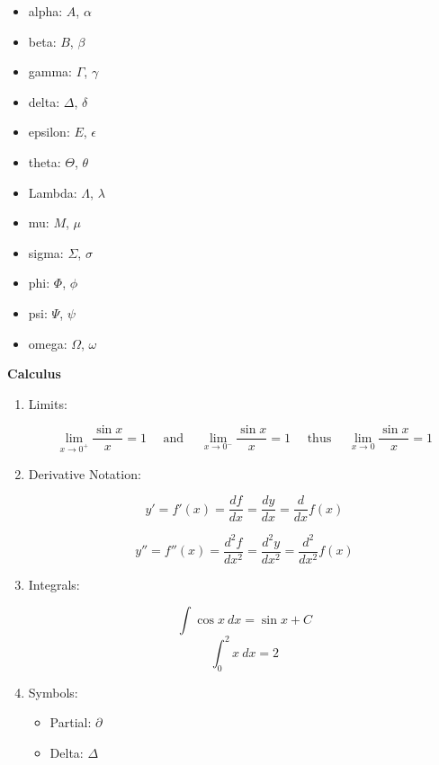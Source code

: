 \documentclass[11pt]{article}
\newcommand{\ra}{\rightarrow}
\begin{document}
\begin{multicols}{2}
\begin{itemize}
\item alpha: $A$, $\alpha$

\item beta: $B$, $\beta$

\item gamma: $\Gamma$, $\gamma$

\item delta: $\Delta$, $\delta$

\item epsilon: $E$, $\epsilon$

\item theta: $\Theta$, $\theta$
\end{itemize}

\begin{itemize}
\item Lambda: $\Lambda$, $\lambda$

\item mu: $M$, $\mu$

\item sigma: $\Sigma$, $\sigma$

\item phi: $\Phi$, $\phi$

\item psi: $\Psi$, $\psi$

\item omega: $\Omega$, $\omega$
\end{itemize}
\end{multicols}

\vspace{0.5cm}

{\large\bf Calculus}


\begin{enumerate}
\item Limits:

$$\lim_{x \ra 0^+} \frac{\sin x}{x} = 1 \quad\text{ and }\quad \lim_{x \ra 0^-}\frac{\sin x}{x} = 1 \quad\text{ thus } \quad\lim_{x \ra 0} \frac{\sin x}{x} =1$$


\item Derivative Notation:

$$y'= f'(x) = \frac{df}{dx} = \frac{dy}{dx}=\frac{d}{dx} f(x) $$

$$y'' = f''(x) = \frac{d^2 f}{dx^2} = \frac{d^2y}{dx^2} = \frac{d^2}{dx^2} f(x)$$


\item Integrals:

$$\int \cos x ~ dx = \sin x + C$$
$$\int_0^2 x ~dx = 2 $$

\item Symbols:

\begin{itemize}
\item Partial: $\partial$
\item Delta: $\Delta$
\end{itemize}



\end{enumerate}
\end{document}
